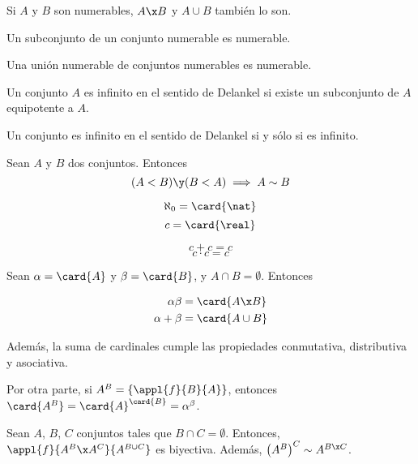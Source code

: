 \documentclass[nochap]{apuntes}
\begin{document}
\begin{prop} Si $A$ y $B$ son numerables, $A\x B$ y $A \cup B$ también lo son.\end{prop}

\begin{prop}Un subconjunto de un conjunto numerable es numerable.\end{prop}

\begin{theorem}
Una unión numerable de conjuntos numerables es numerable.
\end{theorem}

\begin{defn} Un conjunto $A$ es infinito en el sentido de Delankel si existe un subconjunto de $A$ equipotente a $A$.

Un conjunto es infinito en el sentido de Delankel si y sólo si es infinito.\end{defn}

\begin{theorem}
Sean $A$ y $B$ dos conjuntos. Entonces \[ (A<B) \y (B<A) \implies A\sim B \]
\end{theorem}

\begin{defn}
\[\aleph_0 =\card{\nat} \]
\[ c = \card{\real} \]
\end{defn}

\begin{theorem}
\[c+c = c\]
\[ c\cdot c = c \]
\end{theorem}

\begin{prop} Sean $\alpha=\card{A}$ y $\beta = \card{B}$, y $A\cap B =\emptyset$. Entonces 

\begin{align*}
\alpha\beta &= \card{A\x B} \\
\alpha + \beta &= \card{A\cup B}\\
\end{align*}

Además, la suma de cardinales cumple las propiedades conmutativa, distributiva y asociativa.

Por otra parte, si $A^B=\{\appl{f}{B}{A}\}$, entonces $\card{A^B}=\card{A}^{\card{B}}=\alpha^\beta$.
\end{prop}

\begin{lemma} Sean $A$, $B$, $C$ conjuntos tales que $B\cap C = \emptyset$. Entonces, $\appl{f}{A^B\x A^C}{A^{B\cup C}}$ es biyectiva.
Además, $\left(A^B\right)^C \sim A^{B\x C}$.
\end{lemma}
\end{document}
